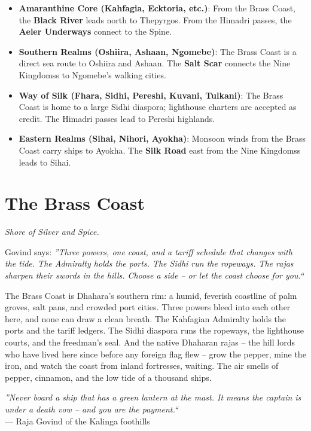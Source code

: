 \documentclass[12pt,oneside]{book}
\begin{document}
\begin{itemize}
  \item \textbf{Amaranthine Core (Kahfagia, Ecktoria, etc.)}: From the Brass Coast, the \textbf{Black River} leads north to Thepyrgos. From the Himadri passes, the \textbf{Aeler Underways} connect to the Spine.
  \item \textbf{Southern Realms (Oshiira, Ashaan, Ngomebe)}: The Brass Coast is a direct sea route to Oshiira and Ashaan. The \textbf{Salt Scar} connects the Nine Kingdomss to Ngomebe's walking cities.
  \item \textbf{Way of Silk (Fhara, Sidhi, Pereshi, Kuvani, Tulkani)}: The Brass Coast is home to a large Sidhi diaspora; lighthouse charters are accepted as credit. The Himadri passes lead to Pereshi highlands.
  \item \textbf{Eastern Realms (Sihai, Nihori, Ayokha)}: Monsoon winds from the Brass Coast carry ships to Ayokha. The \textbf{Silk Road} east from the Nine Kingdomss leads to Sihai.
\end{itemize}
\newpage

\chapter{The Brass Coast}
\emph{Shore of Silver and Spice.}

\noindent
Govind says: \textit{''Three powers, one coast, and a tariff schedule that changes with the tide. The Admiralty holds the ports. The Sidhi run the ropeways. The rajas sharpen their swords in the hills. Choose a side -- or let the coast choose for you.``}

\noindent
The Brass Coast is Dhahara's southern rim: a humid, feverish coastline of palm groves, salt pans, and crowded port cities. Three powers bleed into each other here, and none can draw a clean breath. The Kahfagian Admiralty holds the ports and the tariff ledgers. The Sidhi diaspora runs the ropeways, the lighthouse courts, and the freedman's seal. And the native Dhaharan rajas -- the hill lords who have lived here since before any foreign flag flew -- grow the pepper, mine the iron, and watch the coast from inland fortresses, waiting. The air smells of pepper, cinnamon, and the low tide of a thousand ships.

\vspace{0.5em}
\noindent\textit{''Never board a ship that has a green lantern at the mast. It means the captain is under a death vow -- and you are the payment.``} \\
--- Raja Govind of the Kalinga foothills
\end{document}
